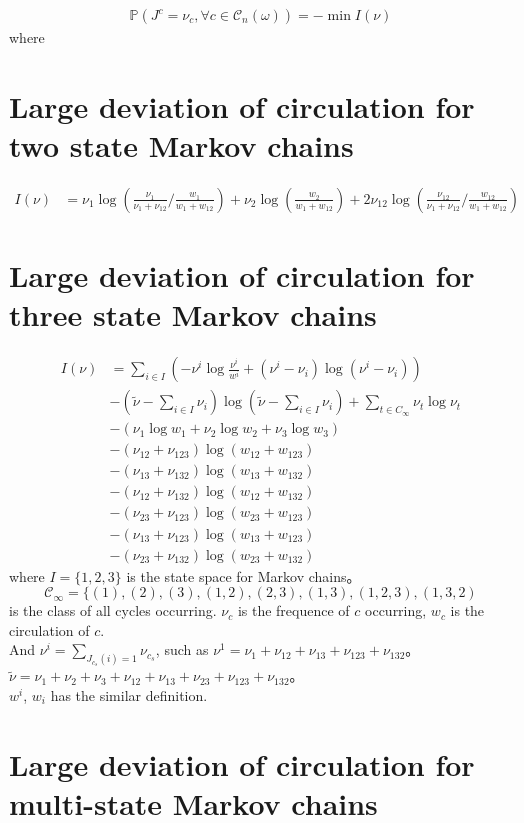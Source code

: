 \documentclass[11pt,en,cite=authoryear]{elegantpaper}
\begin{document}
\begin{lemma}
    \begin{align*}
        \mathbb{P}(J^c = \nu_c, \forall c \in \mathcal{C}_n(\omega)) = - \min I(\nu)
    \end{align*}
    where 
\end{lemma}

\section{Large deviation of circulation for two state Markov chains}
\begin{align*}
    I(\nu) &= \nu_{1}\log(\frac{\nu_{1}}{\nu_{1}+\nu_{12}}/\frac{w_{1}}{w_{1}+w_{12}}) + \nu_{2}\log(\frac{w_{2}}{w_{1}+w_{12}}) + 2\nu_{12} \log (\frac{\nu_{12}}{\nu_{1}+\nu_{12}}/\frac{w_{12}}{w_{1}+w_{12}})
\end{align*}

\section{Large deviation of circulation for three state Markov chains}
\begin{align*}
    I(\nu) 
    &= \sum_{i \in I} \left(-\nu^{i} \log \frac{\nu^{i}}{w^{i}} + (\nu^{i} - \nu_{i}) \log(\nu^{i} - \nu_{i})\right) \\
    &-(\tilde{\nu} - \sum_{i \in I} \nu_i) \log (\tilde{\nu} - \sum_{i \in I} \nu_i)
    +\sum_{t \in C_{\infty}} \nu_t \log \nu_t \\
    &- (\nu_{1} \log w_{1} + \nu_{2} \log w_{2} + \nu_{3} \log w_{3})\\
    &- (\nu_{12} + \nu_{123}) \log(w_{12} + w_{123}) \\
    &- (\nu_{13} + \nu_{132}) \log(w_{13} + w_{132}) \\
    &- (\nu_{12} + \nu_{132}) \log(w_{12} + w_{132}) \\
    &- (\nu_{23} + \nu_{123}) \log(w_{23} + w_{123}) \\
    &- (\nu_{13} + \nu_{123}) \log(w_{13} + w_{123}) \\
    &- (\nu_{23} + \nu_{132}) \log(w_{23} + w_{132}) 
\end{align*}
where $I=\{1, 2, 3\}$ is the state space for Markov chains。
$$\mathcal{C}_{\infty} = \{(1), (2), (3), (1,2), (2,3), (1,3), (1,2,3), (1,3,2)$$
is the class of all cycles occurring.
$\nu_c$ is the frequence of $c$ occurring, $w_c$ is the circulation of $c$.\\
And $\nu^{i} = \sum_{J_{c_s}(i)=1} \nu_{c_s}$, such as $\nu^{1} = \nu_{1} + \nu_{12} + \nu_{13} + \nu_{123} +\nu_{132}$。
$\tilde{\nu} = \nu_{1} + \nu_{2} + \nu_{3} + \nu_{12} + \nu_{13} + \nu_{23} + \nu_{123} +\nu_{132}$。\\
$w^i$, $w_i$ has the similar definition.

\section{Large deviation of circulation for multi-state Markov chains}

\end{document}
